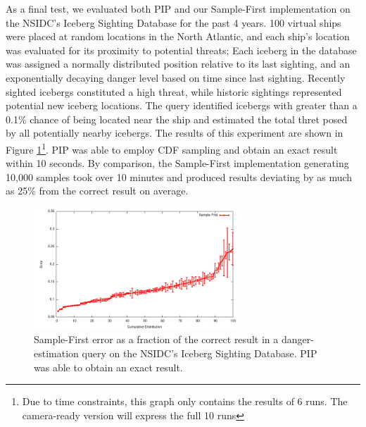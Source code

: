 As a final test, we evaluated both PIP and our Sample-First implementation on the NSIDC's Iceberg Sighting Database\cite{iceberg} for the past 4 years.  100 virtual ships were placed at random locations in the North Atlantic, and each ship's location was evaluated for its proximity to potential threats; Each iceberg in the database was assigned a normally distributed position relative to its last sighting, and an exponentially decaying danger level based on time since last sighting.  Recently sighted icebergs constituted a high threat, while historic sightings represented potential new iceberg locations.  The query identified icebergs with greater than a 0.1\% chance of being located near the ship and estimated the total thret posed by all potentially nearby icebergs.  The results of this experiment are shown in Figure \ref{fig:iceberg}\footnote{Due to time constraints, this graph only contains the results of 6 runs.  The camera-ready version will express the full 10 runs}.  PIP was able to employ CDF sampling and obtain an exact result within 10 seconds.  By comparison, the Sample-First implementation generating 10,000 samples took over 10 minutes and produced results deviating by as much as 25\% from the correct result on average.

\begin{figure}
\begin{center}
\includegraphics[width=3in]{graphics/iceberg_danger.pdf}
\caption{Sample-First error as a fraction of the correct result in a danger-estimation query on the NSIDC's Iceberg Sighting Database.  PIP was able to obtain an exact result.}
\end{center}
\label{fig:iceberg}
\vspace*{-0.3in}
\end{figure}

